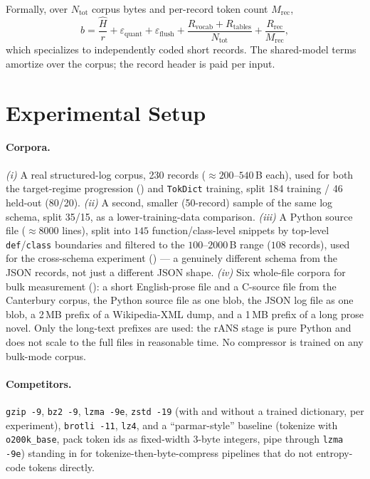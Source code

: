 \documentclass[10pt,twocolumn]{article}
\theoremstyle{plain}
\theoremstyle{definition}
\begin{document}
Formally, over $N_{\mathrm{tot}}$ corpus bytes and per-record token count
$M_{\mathrm{rec}}$,
\[
b = \frac{\hat H}{r} + \varepsilon_{\mathrm{quant}}
+ \varepsilon_{\mathrm{flush}}
+ \frac{R_{\mathrm{vocab}} + R_{\mathrm{tables}}}{N_{\mathrm{tot}}}
+ \frac{R_{\mathrm{rec}}}{M_{\mathrm{rec}}},
\]
which specializes  to independently coded short records. The
shared-model terms amortize over the corpus; the record header is paid per input.

\section{Experimental Setup}

\paragraph{Corpora.} \emph{(i)} A real structured-log corpus, 230 records
($\approx 200$--$540$\,B each), used for both the target-regime progression
() and \texttt{TokDict} training, split 184 training / 46 held-out
(80/20). \emph{(ii)} A second, smaller (50-record) sample of the same log schema,
split 35/15, as a lower-training-data comparison. \emph{(iii)} A Python source file
($\approx 8000$ lines), split into $145$ function/class-level snippets by top-level
\texttt{def}/\texttt{class} boundaries and filtered to the $100$--$2000$\,B range
($108$ records), used for the cross-schema experiment () ---
a genuinely different schema from the JSON records, not just a different JSON shape.
\emph{(iv)} Six whole-file corpora for bulk measurement (): a short
English-prose file and a C-source file from the Canterbury corpus, the Python source
file as one blob, the JSON log file as one blob, a 2\,MB prefix of a Wikipedia-XML
dump, and a 1\,MB prefix of a long prose novel. Only the long-text prefixes are used:
the rANS stage is pure Python and does not scale to the full files in reasonable
time. No compressor is trained on any bulk-mode corpus.

\paragraph{Competitors.} \texttt{gzip -9}, \texttt{bz2 -9}, \texttt{lzma -9e},
\texttt{zstd -19} (with and without a trained dictionary, per experiment),
\texttt{brotli -11}, \texttt{lz4}, and a ``parmar-style'' baseline (tokenize with
\texttt{o200k\_base}, pack token ids as fixed-width 3-byte integers, pipe through
\texttt{lzma -9e}) standing in for tokenize-then-byte-compress pipelines that do not
entropy-code tokens directly.
\end{document}
